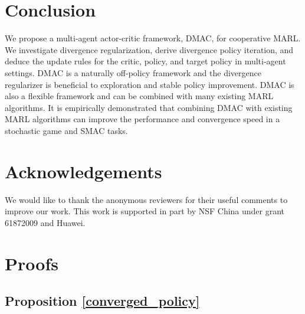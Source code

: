 \documentclass{article}
\begin{document}
\section{Conclusion}
We propose a multi-agent actor-critic framework, DMAC, for cooperative MARL. We investigate divergence regularization, derive divergence policy iteration, and deduce the update rules for the critic, policy, and target policy in multi-agent settings. DMAC is a naturally off-policy framework and the divergence regularizer is beneficial to exploration and stable policy improvement.  DMAC is also a flexible framework and can be combined with many existing MARL algorithms. It is empirically demonstrated that combining DMAC with existing MARL algorithms can improve the performance and convergence speed in a stochastic game and SMAC tasks.

\section*{Acknowledgements}
We would like to thank the anonymous reviewers for their useful comments to improve our work. This work is supported in part by NSF China under grant 61872009 and Huawei.





\newpage
\appendix
\onecolumn

\section{Proofs}
	\label{app:proofs}

\subsection{Proposition \ref{converged_policy}}\label{app:converged_policy}
\end{document}
